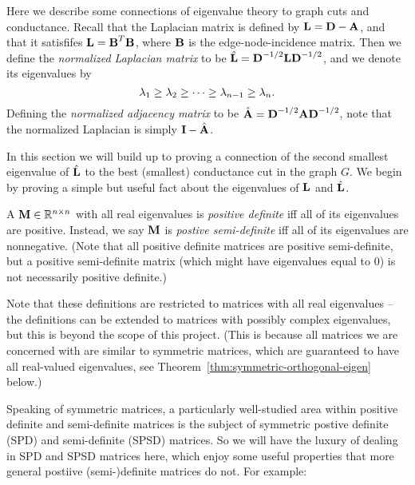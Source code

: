 

Here we describe some connections of eigenvalue theory to graph cuts and conductance.
Recall that the Laplacian matrix is defined by $\textbf{L} = \textbf{D} - \textbf{A}$, and that it satisfifes $\textbf{L} = \textbf{B}^T\textbf{B}$, where $\textbf{B}$ is the edge-node-incidence matrix.
Then we define the \emph{normalized Laplacian matrix} to be $\hat{\textbf{L}} = \textbf{D}^{-1/2}\textbf{L}\textbf{D}^{-1/2}$,
and we denote its eigenvalues by
\[
\lambda_1 \geq \lambda_2 \geq \cdots \geq \lambda_{n-1} \geq \lambda_n.
\]
Defining the \emph{normalized adjacency matrix} to be $\hat{\textbf{A}} = \textbf{D}^{-1/2}\textbf{A}\textbf{D}^{-1/2}$, note that the normalized Laplacian is simply $\textbf{I} - \hat{\textbf{A}}$.

In this section we will build up to proving a connection of the second smallest eigenvalue of $\hat{\textbf{L}}$ to the best (smallest) conductance cut in the graph $G$.
We begin by proving a simple but useful fact about the eigenvalues of $\textbf{L}$ and $\hat{\textbf{L}}$.

A $\textbf{M} \in \mathbb{R}^{n \times n}$ with all real eigenvalues is \emph{positive definite} iff all of its eigenvalues are positive. Instead, we say $\textbf{M}$ is \emph{postive semi-definite} iff all of its eigenvalues are nonnegative.
(Note that all positive definite matrices are positive semi-definite, but a positive semi-definite matrix (which might have eigenvalues equal to 0) is not necessarily positive definite.)

Note that these definitions are restricted to matrices with all real eigenvalues -- the definitions can be extended to matrices with possibly complex eigenvalues, but this is beyond the scope of this project.
(This is because all matrices we are concerned with are similar to symmetric matrices, which are guaranteed to have all real-valued eigenvalues, see Theorem~\ref{thm:symmetric-orthogonal-eigen} below.)

Speaking of symmetric matrices, a particularly well-studied area within positive definite and semi-definite matrices is the subject of symmetric postive definite (SPD) and semi-definite (SPSD) matrices.
So we will have the luxury of dealing in SPD and SPSD matrices here, which enjoy some useful properties that more general postiive (semi-)definite matrices do not. For example:


